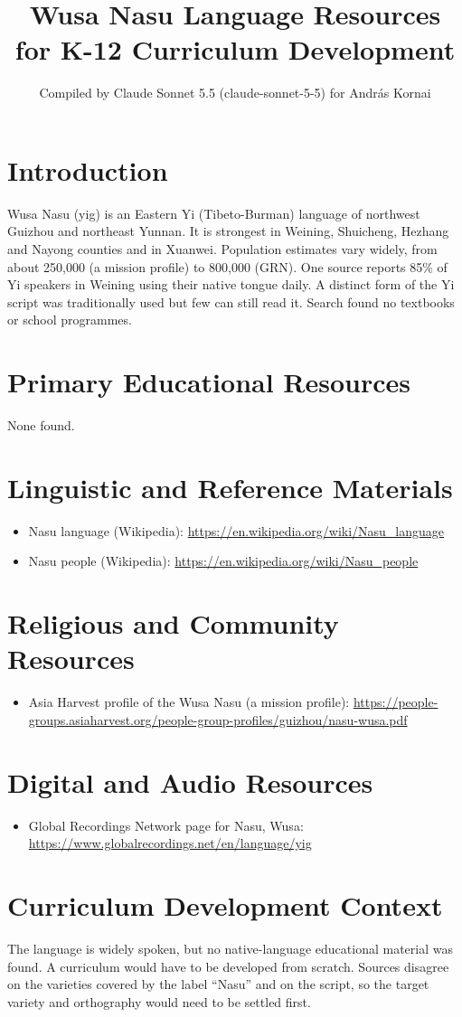 \documentclass[12pt]{article}
\title{Wusa Nasu Language Resources for K-12 Curriculum Development}
\author{Compiled by Claude Sonnet 5.5 (claude-sonnet-5-5) for Andr\'as Kornai}
\date{}
\begin{document}
\maketitle

\section{Introduction}
Wusa Nasu (yig) is an Eastern Yi (Tibeto-Burman) language of northwest Guizhou and northeast Yunnan. It is strongest in Weining, Shuicheng, Hezhang and Nayong counties and in Xuanwei. Population estimates vary widely, from about 250,000 (a mission profile) to 800,000 (GRN). One source reports 85\% of Yi speakers in Weining using their native tongue daily. A distinct form of the Yi script was traditionally used but few can still read it. Search found no textbooks or school programmes.

\section{Primary Educational Resources}
None found.

\section{Linguistic and Reference Materials}
\begin{itemize}
\item Nasu language (Wikipedia): \url{https://en.wikipedia.org/wiki/Nasu_language}
\item Nasu people (Wikipedia): \url{https://en.wikipedia.org/wiki/Nasu_people}
\end{itemize}

\section{Religious and Community Resources}
\begin{itemize}
\item Asia Harvest profile of the Wusa Nasu (a mission profile): \url{https://people-groups.asiaharvest.org/people-group-profiles/guizhou/nasu-wusa.pdf}
\end{itemize}

\section{Digital and Audio Resources}
\begin{itemize}
\item Global Recordings Network page for Nasu, Wusa: \url{https://www.globalrecordings.net/en/language/yig}
\end{itemize}

\section{Curriculum Development Context}
The language is widely spoken, but no native-language educational material was found. A curriculum would have to be developed from scratch. Sources disagree on the varieties covered by the label ``Nasu'' and on the script, so the target variety and orthography would need to be settled first.
\end{document}
